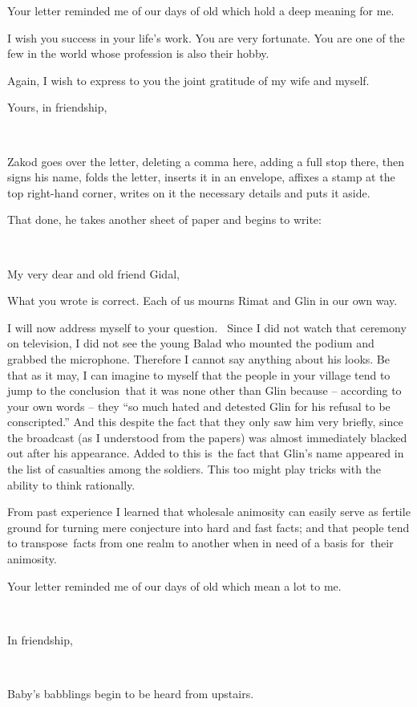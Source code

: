 \documentclass[twoside,11pt]{book}
\begin{document}
Your letter reminded me of our days of old which hold a deep meaning for me.

I wish you success in your life's work. You are very fortunate. You are one of the few in the world whose profession is
also their hobby.

Again, I wish to express to you the joint gratitude of my wife and myself.

Yours, in friendship,

~

Zakod goes over the letter, deleting a comma here, adding a full stop there, then signs his name, folds the letter,
inserts it in an envelope, affixes a stamp at the top right-hand corner, writes on it the necessary details and puts it
aside.

That done, he takes another sheet of paper and begins to write:

~

My very dear and old friend Gidal,

What you wrote is correct. Each of us mourns Rimat and Glin in our own way.

I will now address myself to your question. ~Since I did not watch that ceremony on television, I did not see the young
Balad who mounted the podium and grabbed the microphone. Therefore I cannot say anything about his looks. Be that as it
may, I can imagine to myself that the people in your village tend to jump to the conclusion~that it was none other than
Glin because -- according to your own words -- they ``so much hated and detested Glin for his refusal to
be conscripted.'' And this despite the fact that they only saw him very briefly, since the broadcast (as I
understood from the papers) was almost immediately blacked out after his appearance. Added to this is~the fact that
Glin's name appeared in the list of casualties among the soldiers. This too might play tricks with the ability to think
rationally.

From past experience I learned that wholesale animosity can easily serve as fertile ground for turning mere conjecture
into hard and fast facts; and that people tend to transpose~facts from one realm to another when in need of a basis
for~their animosity.

Your letter reminded me of our days of old which mean a lot to me.

~

In friendship,

~

Baby's babblings begin to be heard from upstairs.~~~~~~
\end{document}

